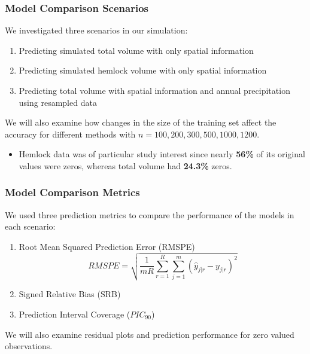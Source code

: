 \documentclass{beamer}
\begin{document}
\begin{frame}
	\frametitle{Model Comparison Scenarios}
	We investigated three scenarios in our simulation:
	\begin{enumerate}
		\item Predicting simulated total volume with only spatial information
		\item Predicting simulated hemlock volume with only spatial information
		\item Predicting total volume with spatial information and annual precipitation using resampled data
	\end{enumerate}
	We will also examine how changes in the size of the training set affect the accuracy for different methods with $n = 100, 200, 300, 500, 1000, 1200$.
	\begin{itemize}
		\item Hemlock data was of particular study interest since nearly \textbf{56\%} of its original values were zeros, whereas total volume had \textbf{24.3\%} zeros.
	\end{itemize}
\end{frame}

\begin{frame}
	\frametitle{Model Comparison Metrics}
	We used three prediction metrics to compare the performance of the models in each scenario:
	\begin{enumerate}
		\item Root Mean Squared Prediction Error (RMSPE)
		$$
		RMSPE = \sqrt{\frac{1}{mR} \sum_{r=1}^R \sum_{j=1}^m (\hat{y}_{j|r} - y_{j|r})^2}
		$$
		\item Signed Relative Bias (SRB)
		\item Prediction Interval Coverage ($PIC_{90}$)
	\end{enumerate}
	We will also examine residual plots and prediction performance for zero valued observations.
\end{frame}

\end{document}
